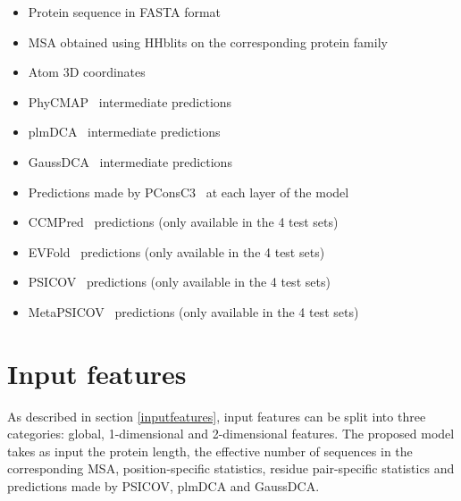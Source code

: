 
  \begin{itemize}
    \item Protein sequence in FASTA format
    \item MSA obtained using HHblits on the corresponding protein family
    \item Atom 3D coordinates
    \item PhyCMAP~\cite{PhyCMap} intermediate predictions
    \item plmDCA~\cite{EKEBERG2014341} intermediate predictions
    \item GaussDCA~\cite{10.1371/journal.pone.0092721} intermediate predictions
    \item Predictions made by PConsC3~\cite{Skwark079673} at each layer of the model
    \item CCMPred~\cite{CCMPred} predictions (only available in the 4 test sets)
    \item EVFold~\cite{Sheridan021022} predictions (only available in the 4 test sets)
    \item PSICOV~\cite{doi:10.1093/bioinformatics/btr638} predictions (only available in the 4 test sets)
    \item MetaPSICOV~\cite{MetaPSICOV} predictions (only available in the 4 test sets)
  \end{itemize}



\section{Input features}

  As described in section \ref{inputfeatures}, input features can be split into three categories:
  global, 1-dimensional and 2-dimensional features.
  The proposed model takes as input the protein length, the effective number of sequences 
  in the corresponding MSA, position-specific statistics, residue pair-specific statistics
  and predictions made by PSICOV, plmDCA and GaussDCA.

